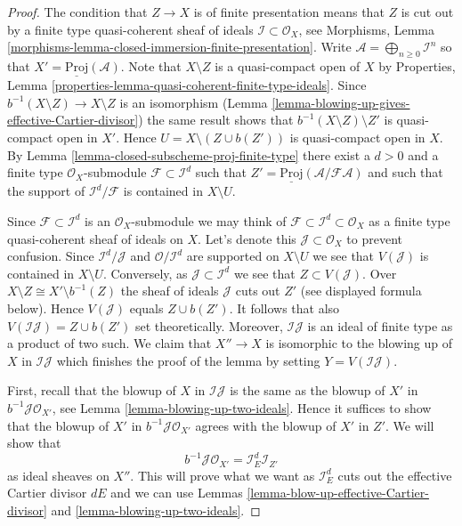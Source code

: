 \documentclass[10pt,a4paper]{amsart}
\theoremstyle{plain}
\theoremstyle{definition}
\theoremstyle{remark}
\numberwithin{equation}{subsection}
\begin{document}
\begin{proof}
The condition that $Z \to X$ is of finite presentation means that
$Z$ is cut out by a finite type quasi-coherent sheaf of ideals
$\mathcal{I} \subset \mathcal{O}_X$, see
Morphisms, Lemma \ref{morphisms-lemma-closed-immersion-finite-presentation}.
Write $\mathcal{A} = \bigoplus_{n \geq 0} \mathcal{I}^n$ so that
$X' = \underline{\text{Proj}}(\mathcal{A})$.
Note that $X \setminus Z$ is a quasi-compact open of $X$ by
Properties, Lemma \ref{properties-lemma-quasi-coherent-finite-type-ideals}.
Since $b^{-1}(X \setminus Z) \to X \setminus Z$ is an isomorphism
(Lemma \ref{lemma-blowing-up-gives-effective-Cartier-divisor}) the same
result shows that
$b^{-1}(X \setminus Z) \setminus Z'$ is quasi-compact open in $X'$.
Hence $U = X \setminus (Z \cup b(Z'))$ is quasi-compact open in $X$.
By Lemma \ref{lemma-closed-subscheme-proj-finite-type}
there exist a $d > 0$ and a finite type
$\mathcal{O}_X$-submodule $\mathcal{F} \subset \mathcal{I}^d$ such
that $Z' = \underline{\text{Proj}}(\mathcal{A}/\mathcal{F}\mathcal{A})$
and such that the support of $\mathcal{I}^d/\mathcal{F}$ is contained
in $X \setminus U$.

\medskip\noindent
Since $\mathcal{F} \subset \mathcal{I}^d$ is an $\mathcal{O}_X$-submodule
we may think of $\mathcal{F} \subset \mathcal{I}^d \subset \mathcal{O}_X$
as a finite type quasi-coherent sheaf of ideals on $X$. Let's denote this
$\mathcal{J} \subset \mathcal{O}_X$ to prevent confusion. Since
$\mathcal{I}^d / \mathcal{J}$ and $\mathcal{O}/\mathcal{I}^d$
are supported on $X \setminus U$ we see that $V(\mathcal{J})$ is contained
in $X \setminus U$. Conversely, as $\mathcal{J} \subset \mathcal{I}^d$
we see that $Z \subset V(\mathcal{J})$. Over
$X \setminus Z \cong X' \setminus b^{-1}(Z)$ the sheaf of ideals
$\mathcal{J}$ cuts out $Z'$ (see displayed formula below). Hence
$V(\mathcal{J})$ equals $Z \cup b(Z')$. It follows that also
$V(\mathcal{I}\mathcal{J}) = Z \cup b(Z')$ set theoretically. Moreover,
$\mathcal{I}\mathcal{J}$ is an ideal of finite type as a product of two such.
We claim that $X'' \to X$ is isomorphic to the blowing up of $X$ in
$\mathcal{I}\mathcal{J}$ which finishes the proof of the lemma by setting
$Y = V(\mathcal{I}\mathcal{J})$.

\medskip\noindent
First, recall that the blowup of $X$ in $\mathcal{I}\mathcal{J}$
is the same as the blowup of $X'$ in $b^{-1}\mathcal{J} \mathcal{O}_{X'}$,
see Lemma \ref{lemma-blowing-up-two-ideals}.
Hence it suffices to show that the blowup of $X'$ in
$b^{-1}\mathcal{J} \mathcal{O}_{X'}$ agrees with the blowup of $X'$
in $Z'$. We will show that
$$
b^{-1}\mathcal{J} \mathcal{O}_{X'} = \mathcal{I}_E^d \mathcal{I}_{Z'}
$$
as ideal sheaves on $X''$. This will prove what we want as
$\mathcal{I}_E^d$ cuts out the effective Cartier divisor $dE$
and we can use Lemmas \ref{lemma-blow-up-effective-Cartier-divisor} and
\ref{lemma-blowing-up-two-ideals}.


\end{proof}
\end{document}
